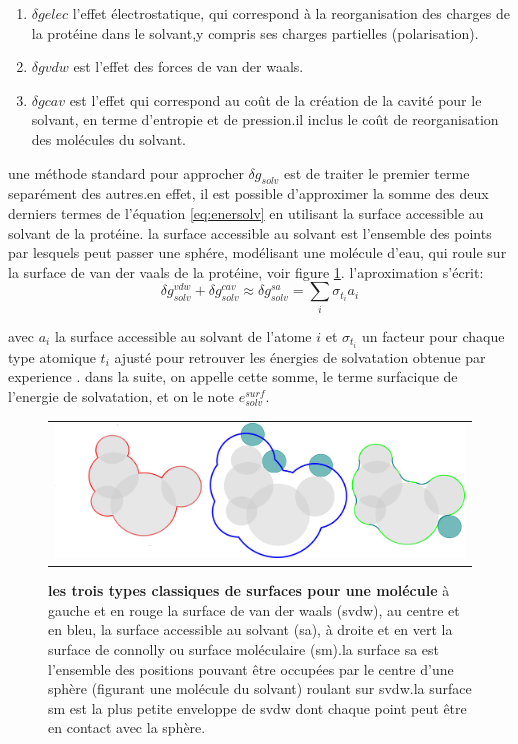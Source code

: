 \begin{enumerate}
\item $\delta g{elec}$ l'effet électrostatique, qui correspond à la reorganisation des charges de la protéine dans le solvant,y compris ses charges partielles (polarisation).
\item $\delta g{vdw}$ est l'effet des forces de van der waals.
  \item $\delta g{cav}$ est l'effet qui correspond au coût de la création de la cavité pour le solvant, en terme d'entropie et de pression.il inclus le coût de reorganisation des molécules du solvant.
\end{enumerate}

une méthode standard pour approcher $\delta g_{solv}$ est de traiter le premier terme separément des autres.en effet, il est possible d'approximer la somme des deux derniers termes de l'équation  \ref{eq:enersolv} en utilisant la surface accessible au solvant de la protéine. la surface accessible au solvant est l'ensemble des points par lesquels peut passer une sphére, modélisant une molécule d'eau, qui roule sur la surface de van der vaals de la protéine, voir figure \ref{graph:surface}.
l'aproximation s'écrit:
\begin{equation}
\delta g_{solv}^{vdw} + \delta g_{solv}^{cav} \approx \delta g_{solv}^{sa} = \sum_i \sigma_{t_i} a_i
\end{equation}

avec $a_i$ la surface accessible au solvant  de l'atome $i$  et $\sigma_{t_i}$ un facteur pour chaque type atomique $t_i$ ajusté pour retrouver les énergies de solvatation obtenue par experience .
dans la suite, on appelle cette somme, le terme surfacique de l'energie de solvatation, et on le note $e_{solv}^{surf}$.

   \begin{figure}[t]
     \centering
     \begin{tabular}{c}
       \includegraphics[width=12cm]{figure/surface.png} &
     \end{tabular}
     
     \caption{\textbf{les trois types classiques de surfaces pour une molécule} à gauche et en rouge la surface de van der waals (svdw), au centre et en bleu, la surface accessible au solvant (sa), à droite et en vert  la surface de connolly ou surface moléculaire (sm).la surface sa est l'ensemble des positions pouvant être occupées par le centre d'une sphère (figurant une molécule du solvant) roulant sur svdw.la surface sm est la plus petite enveloppe de svdw dont chaque point peut être en contact avec la sphère. } 
\label{graph:surface}
   \end{figure}
   

